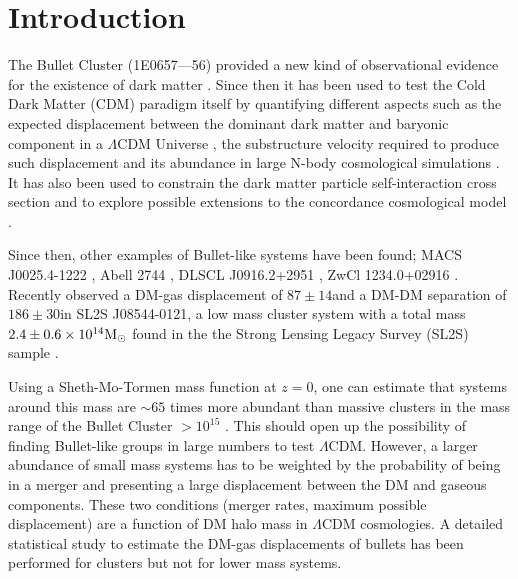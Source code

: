 \documentclass{emulateapj}
\newcommand{\hkpc}{{\ifmmode{h^{-1}{\rm kpc}}\else{$h^{-1}$kpc }\fi}}
\newcommand{\hMsun}{{\ifmmode{h^{-1}{\rm {M_{\odot}}}}\else{$h^{-1}{\rm{M_{\odot}}}$}\fi}}
\newcommand{\Msun}{{\ifmmode{{\rm {M_{\odot}}}}\else{${\rm{M_{\odot}}}$}\fi}}
\newcommand{\bulla}{1E0657---56}
\newcommand{\bullg}{SL2S J08544-0121}
\begin{document}


\section{Introduction}


The Bullet Cluster (\bulla) provided a new kind of observational
evidence for the existence of dark matter
\citep{Markevitch2004,Clowe2006}. Since then it has been used to test
the Cold Dark Matter (CDM) paradigm itself by quantifying different
aspects such as the expected displacement between the dominant dark
matter and baryonic component in a $\Lambda$CDM Universe
\citep{ForeroRomero2010}, the substructure velocity required to
produce such displacement
\citep{Milosavljevic2007,Springel2007,Mastropietro2008} and its
abundance in large N-body cosmological simulations
\citep{Hayashi2006,Lee2012, Thompson2012}. It has also been used to
constrain the dark matter particle self-interaction cross section and
to explore possible extensions to the concordance cosmological model
\citep{Farrar2007,Lee2010}.  
 

Since then, other examples of Bullet-like systems have been found; 
MACS J0025.4-1222 \citep{Bradac2008}, Abell 2744 \citep{Merten2011},
DLSCL J0916.2+2951 \citep{Dawson2012}, ZwCl 1234.0+02916
\citep{Dahle2013}. Recently \citep{Gastaldello} observed a DM-gas
displacement of $87\pm 14$\hkpc and a DM-DM separation of $186\pm
30$\hkpc in \bullg, a low mass cluster system with a total
mass $2.4\pm 0.6 \times 10^{14}\Msun$ found in the the Strong Lensing
Legacy Survey (SL2S) sample \citep{Cabanac2007,More2012}.


Using a Sheth-Mo-Tormen mass function at $z=0$, one can estimate that
systems around this mass are $\sim 65$ times more abundant than massive
clusters in the mass range of the Bullet Cluster $>10^{15}$\hMsun
\citep{Sheth2001,hmfcalc}. This  should open up the possibility of
finding Bullet-like groups in large numbers to test
$\Lambda$CDM. However, a larger abundance of small mass systems has to
be weighted by the probability of being in a merger and  presenting a
large displacement between the DM and gaseous components.  These two
conditions (merger rates, maximum possible displacement) are a function
of DM halo mass in $\Lambda$CDM cosmologies.  A detailed statistical
study to estimate the DM-gas displacements of bullets has been
performed for clusters \citep{ForeroRomero2010} but not for lower mass
systems. 
\end{document}
